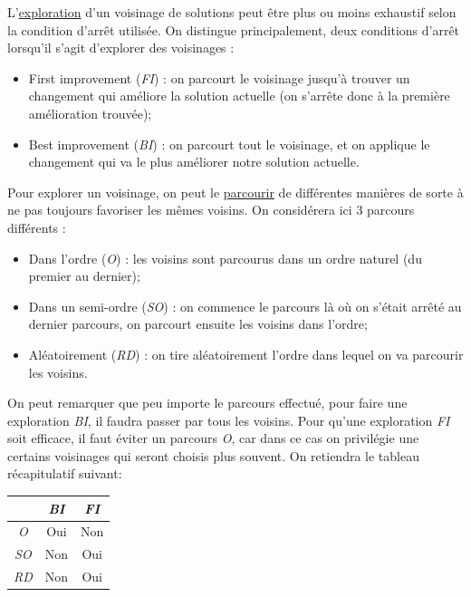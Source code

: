 \documentclass[a4paper,11pt]{article}%
\begin{document}
L'\underline{exploration} d'un voisinage de solutions peut être plus ou moins exhaustif selon la condition d'arrêt utilisée.
On distingue principalement, deux conditions d'arrêt lorsqu'il s'agit d'explorer des voisinages :

\begin{itemize}
\item First improvement (\emph{FI}) : on parcourt le voisinage jusqu'à trouver un changement qui améliore la solution actuelle (on s'arrête donc à la première amélioration trouvée);
\item Best improvement (\emph{BI}) : on parcourt tout le voisinage, et on applique le changement qui va le plus améliorer notre solution actuelle. \\
\end{itemize}

Pour explorer un voisinage, on peut le \underline{parcourir} de différentes manières de sorte à ne pas toujours favoriser les mêmes voisins. On considérera ici 3 parcours différents : 

\begin{itemize}
\item Dans l'ordre (\emph{O}) : les voisins sont parcourus dans un ordre naturel (du premier au dernier);
\item Dans un semi-ordre (\emph{SO}) : on commence le parcours là où on s'était arrêté au dernier parcours, on parcourt ensuite les voisins dans l'ordre;
\item Aléatoirement (\emph{RD}) : on tire aléatoirement l'ordre dans lequel on va parcourir les voisins. \\
\end{itemize}

On peut remarquer que peu importe le parcours effectué, pour faire une exploration \emph{BI}, il faudra passer par tous les voisins. Pour qu'une exploration \emph{FI} soit efficace, il faut éviter un parcours \emph{O}, car dans ce cas on privilégie une certains voisinages qui seront choisis plus souvent. On retiendra le tableau récapitulatif suivant:

\begin{center}
\begin{tabular}{|c|c|c|}
   \hline
     & \emph{BI} & \emph{FI}  \\
   \hline
   \emph{O} & Oui & Non \\
   \hline
   \emph{SO} & Non & Oui \\
   \hline
   \emph{RD} & Non & Oui  \\
   \hline
\end{tabular}
\end{center}
\end{document}
